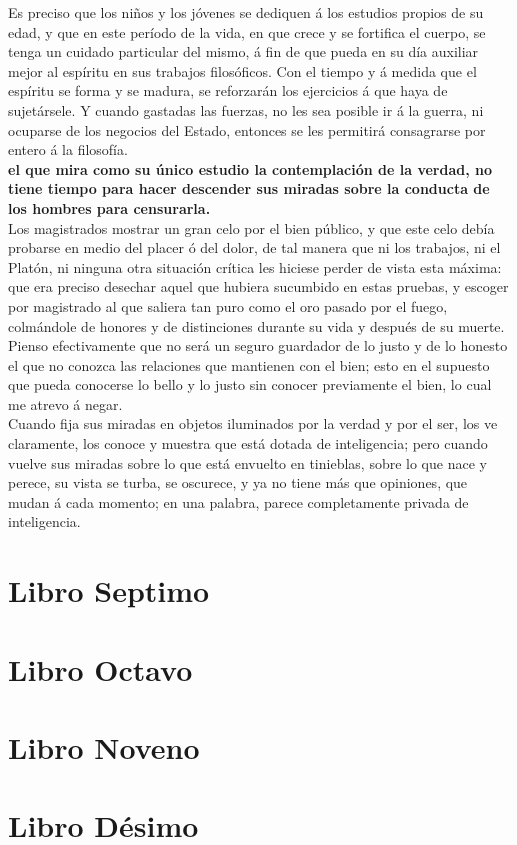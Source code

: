 \documentclass[10pt]{book}
\begin{document}
Es preciso que los niños y los jóvenes se dediquen á los estudios propios de su edad, y que en este período de la vida, en que crece y se fortifica el cuerpo, se tenga un cuidado particular del mismo, á fin de que pueda en su día auxiliar mejor al espíritu en sus trabajos filosóficos. Con el tiempo y á medida que el espíritu se forma y se madura, se reforzarán los ejercicios á que haya de sujetársele. Y cuando gastadas las fuerzas, no les sea posible ir á la guerra, ni ocuparse de los negocios del Estado, entonces se les permitirá consagrarse por entero á la filosofía.\\
\textbf{el que mira como su único estudio la contemplación de la verdad, no tiene tiempo para hacer descender sus miradas sobre la conducta de los hombres para censurarla.}\\
Los magistrados mostrar un gran celo por el bien público, y que este celo debía probarse en medio del placer ó del dolor, de tal manera que ni los trabajos, ni el Platón, ni ninguna otra situación crítica les hiciese perder de vista esta máxima: que era preciso desechar aquel que hubiera sucumbido en estas pruebas, y escoger por magistrado al que saliera tan puro como el oro pasado por el fuego, colmándole de honores y de distinciones durante su vida y después de su muerte.\\
Pienso efectivamente que no será un seguro guardador de lo justo y de lo honesto el que no conozca las relaciones que mantienen con el bien; esto en el supuesto que pueda conocerse lo bello y lo justo sin conocer previamente el bien, lo cual me atrevo á negar. \\
Cuando fija sus miradas en objetos iluminados por la verdad y por el ser, los ve claramente, los conoce y muestra que está dotada de inteligencia; pero cuando vuelve sus miradas sobre lo que está envuelto en tinieblas, sobre lo que nace y perece, su vista se turba, se oscurece, y ya no tiene más que opiniones, que mudan á cada momento; en una palabra, parece completamente privada de inteligencia. \\


\chapter*{Libro Septimo}

\chapter*{Libro Octavo}

\chapter*{Libro Noveno}

\chapter*{Libro Désimo}
 
\end{document}
